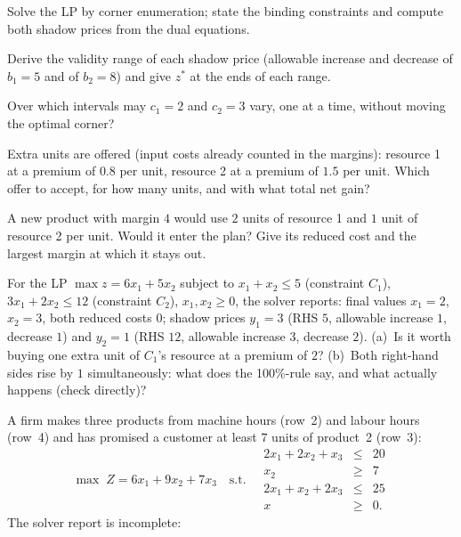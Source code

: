 \begin{problems}
  \item Solve the LP by corner enumeration; state the binding constraints
        and compute both shadow prices from the dual equations.
  \item Derive the validity range of each shadow price (allowable
        increase and decrease of $b_{1}=5$ and of $b_{2}=8$) and give
        $z^{*}$ at the ends of each range.
  \item Over which intervals may $c_{1}=2$ and $c_{2}=3$ vary, one at a
        time, without moving the optimal corner?
  \item Extra units are offered (input costs already counted in the
        margins): resource 1 at a premium of $0.8$ per unit, resource 2
        at a premium of $1.5$ per unit. Which offer to accept, for how
        many units, and with what total net gain?
  \item A new product with margin $4$ would use $2$ units of resource 1
        and $1$ unit of resource 2 per unit. Would it enter the plan?
        Give its reduced cost and the largest margin at which it stays
        out.
  \item For the LP $\max z=6x_{1}+5x_{2}$ subject to $x_{1}+x_{2}\le 5$
        (constraint $C_{1}$), $3x_{1}+2x_{2}\le 12$ (constraint $C_{2}$),
        $x_{1},x_{2}\ge0$, the solver reports: final values
        $x_{1}=2$, $x_{2}=3$, both reduced costs $0$; shadow prices
        $y_{1}=3$ (RHS $5$, allowable increase $1$, decrease $1$) and
        $y_{2}=1$ (RHS $12$, allowable increase $3$, decrease $2$).
        (a)~Is it worth buying one extra unit of $C_{1}$'s resource at a
        premium of $2$? (b)~Both right-hand sides rise by $1$
        simultaneously: what does the 100\%-rule say, and what actually
        happens (check directly)?
  \item A firm makes three products from machine hours (row~2) and labour
        hours (row~4) and has promised a customer at least $7$ units of
        product~2 (row~3):
        \[
          \max\; Z=6x_{1}+9x_{2}+7x_{3}
          \quad\text{s.t.}\quad
          \begin{array}{rcl}
            2x_{1}+2x_{2}+x_{3} &\le& 20\\
            x_{2} &\ge& 7\\
            2x_{1}+x_{2}+2x_{3} &\le& 25\\
            x &\ge& 0 .
          \end{array}
        \]
        The solver report is incomplete:

\end{problems}
